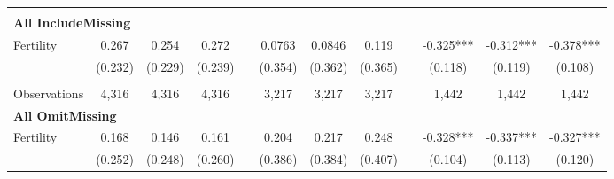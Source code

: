 \begin{landscape}
\begin{table}[htpb!]
\begin{center}
\begin{tabular}{lcccp{2mm}cccp{2mm}ccc}
\begin{footnotesize}\end{footnotesize}\\ 
\multicolumn{12}{l}{\textbf{All IncludeMissing}}\\ 
Fertility&0.267&0.254&0.272&&0.0763&0.0846&0.119&&-0.325***&-0.312***&-0.378***\\
&(0.232)&(0.229)&(0.239)&&(0.354)&(0.362)&(0.365)&&(0.118)&(0.119)&(0.108)\\
\begin{footnotesize}\end{footnotesize}&\begin{footnotesize}\end{footnotesize}&\begin{footnotesize}\end{footnotesize}&\begin{footnotesize}\end{footnotesize}&\begin{footnotesize}\end{footnotesize}&\begin{footnotesize}\end{footnotesize}&\begin{footnotesize}\end{footnotesize}&\begin{footnotesize}\end{footnotesize}&\begin{footnotesize}\end{footnotesize}&\begin{footnotesize}\end{footnotesize}&\begin{footnotesize}\end{footnotesize}&\begin{footnotesize}\end{footnotesize}\\Observations&4,316&4,316&4,316&&3,217&3,217&3,217&&1,442&1,442&1,442\\
\multicolumn{12}{l}{\textbf{All OmitMissing}}\\ 
Fertility&0.168&0.146&0.161&&0.204&0.217&0.248&&-0.328***&-0.337***&-0.327***\\
&(0.252)&(0.248)&(0.260)&&(0.386)&(0.384)&(0.407)&&(0.104)&(0.113)&(0.120)\\

\end{tabular}
\end{center}
\end{table}
\end{landscape}
